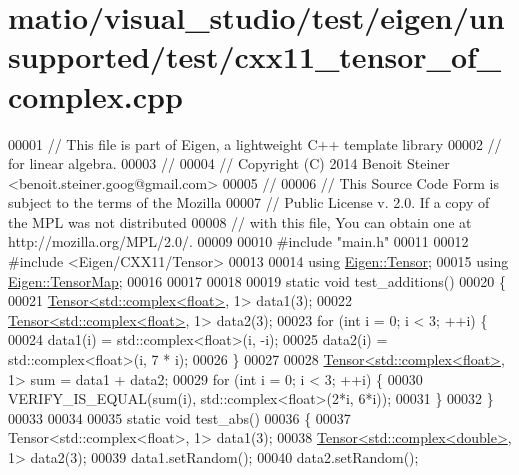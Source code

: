 \hypertarget{matio_2visual__studio_2test_2eigen_2unsupported_2test_2cxx11__tensor__of__complex_8cpp_source}{}\section{matio/visual\+\_\+studio/test/eigen/unsupported/test/cxx11\+\_\+tensor\+\_\+of\+\_\+complex.cpp}
\label{matio_2visual__studio_2test_2eigen_2unsupported_2test_2cxx11__tensor__of__complex_8cpp_source}

\begin{DoxyCode}
00001 \textcolor{comment}{// This file is part of Eigen, a lightweight C++ template library}
00002 \textcolor{comment}{// for linear algebra.}
00003 \textcolor{comment}{//}
00004 \textcolor{comment}{// Copyright (C) 2014 Benoit Steiner <benoit.steiner.goog@gmail.com>}
00005 \textcolor{comment}{//}
00006 \textcolor{comment}{// This Source Code Form is subject to the terms of the Mozilla}
00007 \textcolor{comment}{// Public License v. 2.0. If a copy of the MPL was not distributed}
00008 \textcolor{comment}{// with this file, You can obtain one at http://mozilla.org/MPL/2.0/.}
00009 
00010 \textcolor{preprocessor}{#include "main.h"}
00011 
00012 \textcolor{preprocessor}{#include <Eigen/CXX11/Tensor>}
00013 
00014 \textcolor{keyword}{using} \hyperlink{class_eigen_1_1_tensor}{Eigen::Tensor};
00015 \textcolor{keyword}{using} \hyperlink{class_eigen_1_1_tensor_map}{Eigen::TensorMap};
00016 
00017 
00018 
00019 \textcolor{keyword}{static} \textcolor{keywordtype}{void} test\_additions()
00020 \{
00021   \hyperlink{class_eigen_1_1_tensor}{Tensor<std::complex<float>}, 1> data1(3);
00022   \hyperlink{class_eigen_1_1_tensor}{Tensor<std::complex<float>}, 1> data2(3);
00023   \textcolor{keywordflow}{for} (\textcolor{keywordtype}{int} i = 0; i < 3; ++i) \{
00024     data1(i) = std::complex<float>(i, -i);
00025     data2(i) = std::complex<float>(i, 7 * i);
00026   \}
00027 
00028   \hyperlink{class_eigen_1_1_tensor}{Tensor<std::complex<float>}, 1> sum = data1 + data2;
00029   \textcolor{keywordflow}{for} (\textcolor{keywordtype}{int} i = 0; i < 3; ++i) \{
00030     VERIFY\_IS\_EQUAL(sum(i),  std::complex<float>(2*i, 6*i));
00031   \}
00032 \}
00033 
00034 
00035 \textcolor{keyword}{static} \textcolor{keywordtype}{void} test\_abs()
00036 \{
00037   Tensor<std::complex<float>, 1> data1(3);
00038   \hyperlink{class_eigen_1_1_tensor}{Tensor<std::complex<double>}, 1> data2(3);
00039   data1.setRandom();
00040   data2.setRandom();

\end{DoxyCode}
